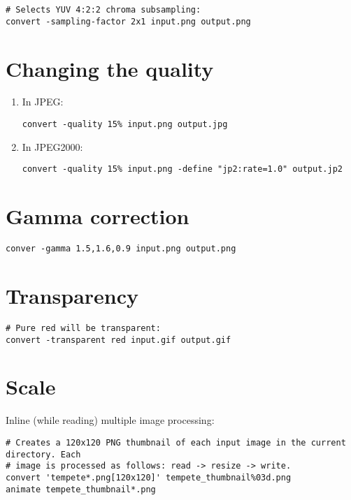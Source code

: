 \begin{lstlisting}
# Selects YUV 4:2:2 chroma subsampling:
convert -sampling-factor 2x1 input.png output.png
\end{lstlisting}


\section{Changing the quality}

\begin{enumerate}
\item In JPEG:
\begin{lstlisting}
convert -quality 15% input.png output.jpg
\end{lstlisting}

\item In JPEG2000:
\begin{lstlisting}
convert -quality 15% input.png -define "jp2:rate=1.0" output.jp2
\end{lstlisting}

\end{enumerate}

\section{Gamma correction}

\begin{lstlisting}
conver -gamma 1.5,1.6,0.9 input.png output.png
\end{lstlisting}


\section{Transparency}

\begin{lstlisting}
# Pure red will be transparent:
convert -transparent red input.gif output.gif
\end{lstlisting}


\section{Scale}

Inline (while reading) multiple image processing:
\begin{lstlisting}
# Creates a 120x120 PNG thumbnail of each input image in the current directory. Each
# image is processed as follows: read -> resize -> write.
convert 'tempete*.png[120x120]' tempete_thumbnail%03d.png
animate tempete_thumbnail*.png
\end{lstlisting}

